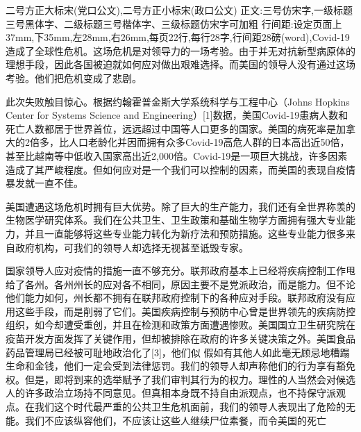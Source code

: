 \documentclass[12pt,twoside]{ctexart}
\begin{document}
\bantou[中央军委训练管理部办公厅]

二号方正大标宋(党口公文),二号方正小标宋(政口公文) 正文:三号仿宋字,一级标题三号黑体字、二级标题三号楷体字、三级标题仿宋字可加粗 行间距:设定页面上37mm,下35mm,左28mm,右26mm,每页22行,每行28字,行间距28磅(word),Covid-19造成了全球性危机。这场危机是对领导力的一场考验。由于并无对抗新型病原体的理想手段，因此各国被迫就如何应对做出艰难选择。而美国的领导人没有通过这场考验。他们把危机变成了悲剧。

此次失败触目惊心。根据约翰霍普金斯大学系统科学与工程中心（Johns Hopkins Center for Systems Science and Engineering）[1]数据，美国Covid-19患病人数和死亡人数都居于世界首位，远远超过中国等人口更多的国家。美国的病死率是加拿大的2倍多，比人口老龄化并因而拥有众多Covid-19高危人群的日本高出近50倍，甚至比越南等中低收入国家高出近2,000倍。Covid-19是一项巨大挑战，许多因素造成了其严峻程度。但如何应对是一个我们可以控制的因素，而美国的表现自疫情暴发就一直不佳。

美国遭遇这场危机时拥有巨大优势。除了巨大的生产能力，我们还有全世界称羡的生物医学研究体系。我们在公共卫生、卫生政策和基础生物学方面拥有强大专业能力，并且一直能够将这些专业能力转化为新疗法和预防措施。这些专业能力很多来自政府机构，可我们的领导人却选择无视甚至诋毁专家。

国家领导人应对疫情的措施一直不够充分。联邦政府基本上已经将疾病控制工作甩给了各州。各州州长的应对各不相同，原因主要不是党派政治，而是能力。但不论他们能力如何，州长都不拥有在联邦政府控制下的各种应对手段。联邦政府没有应用这些手段，而是削弱了它们。美国疾病控制与预防中心曾是世界领先的疾病防控组织，如今却遭受重创，并且在检测和政策方面遭遇惨败。美国国立卫生研究院在疫苗开发方面发挥了关键作用，但却被排除在政府的许多关键决策之外。美国食品药品管理局已经被可耻地政治化了[3]，他们似
假如有其他人如此毫无顾忌地糟蹋生命和金钱，他们一定会受到法律惩罚。我们的领导人却声称他们的行为享有豁免权。但是，即将到来的选举赋予了我们审判其行为的权力。理性的人当然会对候选人的许多政治立场持不同意见。但真相本身既不持自由派观点，也不持保守派观点。在我们这个时代最严重的公共卫生危机面前，我们的领导人表现出了危险的无能。我们不应该纵容他们，不应该让这些人继续尸位素餐，而令美国的死亡



\end{document}
